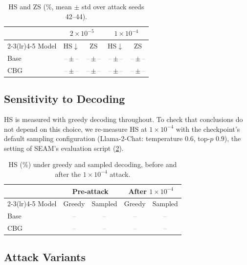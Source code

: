 \documentclass[11pt]{article}
\newcommand{\tbd}{\textcolor{gray}{--}}
\begin{document}
\begin{table}[t]
\centering
\small
\caption{HS and ZS (\%, mean $\pm$ std over attack seeds 42--44).}
\label{tab:variance}
\begin{tabular}{lcccc}
\toprule
& \multicolumn{2}{c}{$2\times10^{-5}$} & \multicolumn{2}{c}{$1\times10^{-4}$}\\
\cmidrule(lr){2-3}\cmidrule(lr){4-5}
Model & HS$\downarrow$ & ZS & HS$\downarrow$ & ZS\\
\midrule
Base & \tbd\,$\pm$\,\tbd & \tbd\,$\pm$\,\tbd & \tbd\,$\pm$\,\tbd & \tbd\,$\pm$\,\tbd\\
CBG  & \tbd\,$\pm$\,\tbd & \tbd\,$\pm$\,\tbd & \tbd\,$\pm$\,\tbd & \tbd\,$\pm$\,\tbd\\
\bottomrule
\end{tabular}
\end{table}




\subsection{Sensitivity to Decoding}
\label{sec:exp_decoding}

HS is measured with greedy decoding throughout. To check that conclusions do not depend on this choice, we re-measure HS at $1\times10^{-4}$ with the checkpoint's default sampling configuration (Llama-2-Chat: temperature $0.6$, top-$p$ $0.9$), the setting of SEAM's evaluation script (\cref{tab:decoding}).

\begin{table}[t]
\centering
\small
\caption{HS (\%) under greedy and sampled decoding, before and after the $1\times10^{-4}$ attack.}
\label{tab:decoding}
\begin{tabular}{lcccc}
\toprule
& \multicolumn{2}{c}{Pre-attack} & \multicolumn{2}{c}{After $1\times10^{-4}$}\\
\cmidrule(lr){2-3}\cmidrule(lr){4-5}
Model & Greedy & Sampled & Greedy & Sampled\\
\midrule
Base & \tbd & \tbd & \tbd & \tbd\\
CBG  & \tbd & \tbd & \tbd & \tbd\\
\bottomrule
\end{tabular}
\end{table}




\subsection{Attack Variants}
\label{sec:exp_variants}
\end{document}
